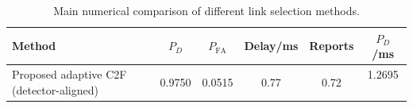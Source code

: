 \begin{table}[t]
    \centering
    \caption{Main numerical comparison of different link selection methods.}
    \label{tab:main_summary}
    \begin{tabular}{l c c c c c}
        \hline
        Method & $P_D$ & $P_{\mathrm{FA}}$ & Delay/ms & Reports & $P_D$/ms \\
        \hline
        Proposed adaptive C2F (detector-aligned) & 0.9750 & 0.0515 & 0.77 & 0.72 & 1.2695 \
        \hline
    \end{tabular}
\end{table}
